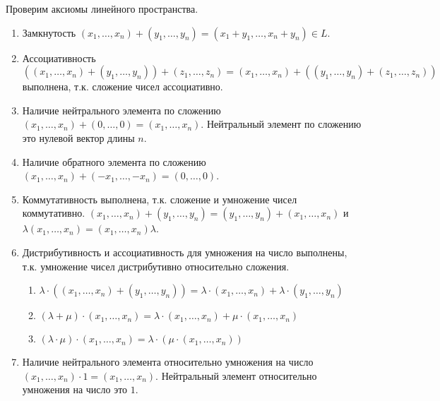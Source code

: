 \begin{remark}
  Проверим аксиомы линейного пространства.
  
  \begin{enumerate}
  \item
    Замкнутость \((x_1, \dotsc, x_n) + (y_1, \dotsc, y_n) = (x_1 + y_1, \dotsc,
    x_n + y_n) \in L\).
    
  \item
    Ассоциативность \(((x_1, \dotsc, x_n) + (y_1, \dotsc, y_n)) + (z_1, \dotsc,
    z_n) = (x_1, \dotsc, x_n) + ((y_1, \dotsc, y_n) + (z_1, \dotsc, z_n))\)
    выполнена, т.к. сложение чисел ассоциативно.
    
  \item
    Наличие нейтрального элемента по сложению \((x_1, \dotsc, x_n) + (0, \dotsc,
    0) = (x_1, \dotsc, x_n)\). Нейтральный элемент по сложению это нулевой
    вектор длины \(n\).
    
  \item
    Наличие обратного элемента по сложению \((x_1, \dotsc, x_n) + (-x_1, \dotsc,
    -x_n) = (0, \dotsc, 0)\).
    
  \item
    Коммутативность выполнена, т.к. сложение и умножение чисел коммутативно.
    \(
      (x_1, \dotsc, x_n) + (y_1, \dotsc, y_n)
      = (y_1, \dotsc, y_n) + (x_1, \dotsc, x_n)
    \) и \(
      \lambda (x_1, \dotsc, x_n)
      = (x_1, \dotsc, x_n) \lambda
    \). 
    
  \item
    Дистрибутивность и ассоциативность для умножения на число выполнены, т.к.
    умножение чисел дистрибутивно относительно сложения.
    
    \begin{enumerate}
    \item
      \(\lambda \cdot ((x_1, \dotsc, x_n) + (y_1, \dotsc, y_n)) = \lambda \cdot
      (x_1, \dotsc, x_n) + \lambda \cdot (y_1, \dotsc, y_n)\)
      
    \item
      \((\lambda + \mu) \cdot (x_1, \dotsc, x_n) = \lambda \cdot (x_1, \dotsc,
      x_n) + \mu \cdot (x_1, \dotsc, x_n)\)
      
    \item
      \((\lambda \cdot \mu) \cdot (x_1, \dotsc, x_n) = \lambda \cdot (\mu \cdot
      (x_1, \dotsc, x_n))\)
    \end{enumerate}
    
  \item
    Наличие нейтрального элемента относительно умножения на число \((x_1,
    \dotsc, x_n) \cdot 1 = (x_1, \dotsc, x_n)\). Нейтральный элемент
    относительно умножения на число это \(1\).
  \end{enumerate}
\end{remark}
